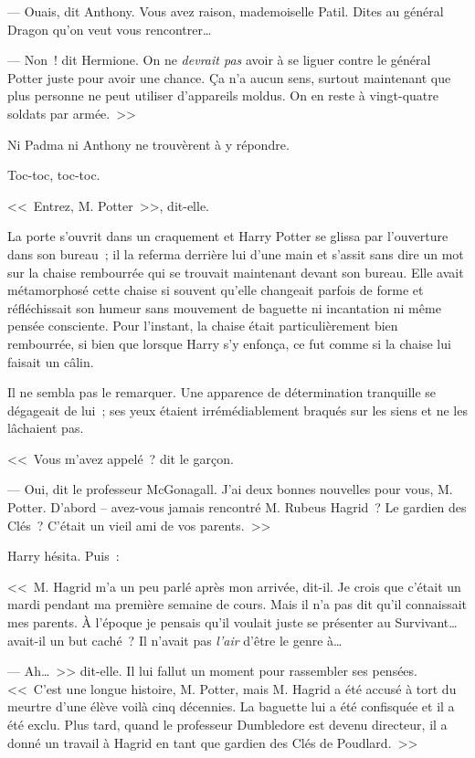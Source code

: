 --- Ouais, dit Anthony. Vous avez raison, mademoiselle Patil. Dites au général Dragon qu'on veut vous rencontrer…

--- Non~! dit Hermione. On ne \emph{devrait pas} avoir à se liguer contre le général Potter juste pour avoir une chance. Ça n'a aucun sens, surtout maintenant que plus personne ne peut utiliser d'appareils moldus. On en reste à vingt-quatre soldats par armée.~>>

Ni Padma ni Anthony ne trouvèrent à y répondre.

\later

Toc-toc, toc-toc.

<<~Entrez, M. Potter~>>, dit-elle.

La porte s'ouvrit dans un craquement et Harry Potter se glissa par l'ouverture dans son bureau~; il la referma derrière lui d'une main et s'assit sans dire un mot sur la chaise rembourrée qui se trouvait maintenant devant son bureau. Elle avait métamorphosé cette chaise si souvent qu'elle changeait parfois de forme et réfléchissait son humeur sans mouvement de baguette ni incantation ni même pensée consciente. Pour l'instant, la chaise était particulièrement bien rembourrée, si bien que lorsque Harry s'y enfonça, ce fut comme si la chaise lui faisait un câlin.

Il ne sembla pas le remarquer. Une apparence de détermination tranquille se dégageait de lui~; ses yeux étaient irrémédiablement braqués sur les siens et ne les lâchaient pas.

<<~Vous m'avez appelé~? dit le garçon.

--- Oui, dit le professeur McGonagall. J'ai deux bonnes nouvelles pour vous, M. Potter. D'abord -- avez-vous jamais rencontré M. Rubeus Hagrid~? Le gardien des Clés~? C'était un vieil ami de vos parents.~>>

Harry hésita. Puis~:

<<~M. Hagrid m'a un peu parlé après mon arrivée, dit-il. Je crois que c'était un mardi pendant ma première semaine de cours. Mais il n'a pas dit qu'il connaissait mes parents. À l'époque je pensais qu'il voulait juste se présenter au Survivant… avait-il un but caché~? Il n'avait pas \emph{l'air} d'être le genre à…

--- Ah…~>> dit-elle. Il lui fallut un moment pour rassembler ses pensées. <<~C'est une longue histoire, M. Potter, mais M. Hagrid a été accusé à tort du meurtre d'une élève voilà cinq décennies. La baguette lui a été confisquée et il a été exclu. Plus tard, quand le professeur Dumbledore est devenu directeur, il a donné un travail à Hagrid en tant que gardien des Clés de Poudlard.~>>

